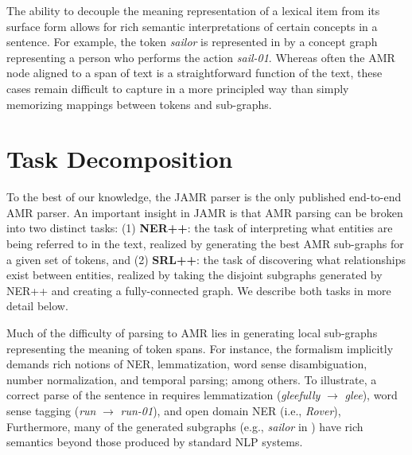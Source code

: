 \documentclass[11pt]{article}
\newcommand\w[1]{\textit{#1}} %
\newcommand\n[1]{\textit{#1}} %
\begin{document}
The ability to decouple the meaning representation of a lexical item from its
  surface form allows for rich semantic interpretations of certain concepts
  in a sentence.
For example, the token \w{sailor} is represented in  by a concept graph 
  representing a person who performs the action \n{sail-01}. 
Whereas often the AMR node aligned to a span of text is a straightforward function
  of the text, these cases remain difficult to capture in a more principled way than
  simply memorizing mappings between tokens and sub-graphs.


\section{Task Decomposition}



To the best of our knowledge, the JAMR parser is
the only published end-to-end AMR parser.
An important insight in JAMR is that AMR parsing can be broken into two 
 distinct tasks: (1) \textbf{NER++}: the task of interpreting what entities are being referred to in 
the text, realized by generating the best AMR sub-graphs for a given set of tokens, and
(2) \textbf{SRL++}: the task of discovering what 
relationships exist between entities, realized by taking the disjoint subgraphs generated
  by NER++ and creating a fully-connected graph.
We describe both tasks in more detail below.


Much of the difficulty of parsing to AMR lies in generating local sub-graphs representing the meaning of token spans.
For instance, the formalism implicitly demands rich notions of NER, lemmatization, word sense disambiguation, number normalization, and temporal parsing; among others.
To illustrate, a correct parse of the sentence in  requires lemmatization (\textit{gleefully} $\rightarrow$ \textit{glee}), word sense tagging (\textit{run} $\rightarrow$ \textit{run-01}), and open domain NER (i.e., \textit{Rover}),
Furthermore, many of the generated subgraphs (e.g., \textit{sailor} in ) have rich semantics beyond those produced by standard NLP systems.
\end{document}
